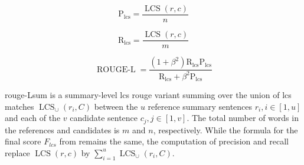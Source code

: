 \begin{equation}
\mathrm{P_{lcs}} = \frac{\operatorname{LCS}(r,c)}{n}
\label{eq:rouge_l_precision}
\end{equation}

\begin{equation}
\mathrm{R_{lcs}} = \frac{\operatorname{LCS}(r,c)}{m}
\label{eq:rouge_l_recall}
\end{equation}

\begin{equation}
\operatorname{ROUGE-L} = \frac{(1 + \beta^2)  \mathrm{R_{lcs}}  \mathrm{P_{lcs}}}{\mathrm{R_{lcs}} + \beta^2  \mathrm{P_{lcs}}}
\label{eq:rouge_l}
\end{equation}

\ac{rouge}-Lsum is a summary-level \ac{lcs} \ac{rouge} variant summing over the union of \ac{lcs} matches $\operatorname{LCS}_\cup(r_i,C)$ between the $u$ reference summary sentences $r_i, i \in [1,u]$ and each of the $v$ candidate sentence $c_j, j \in [1,v]$.
The total number of words in the references and candidates is $m$ and $n$, respectively.
While the formula for the final score $F_{lcs}$ from  remains the same, the computation of precision and recall replace $\operatorname{LCS}(r,c)$ by $\sum_{i=1}^{u}\operatorname{LCS}_\cup(r_i,C)$.
